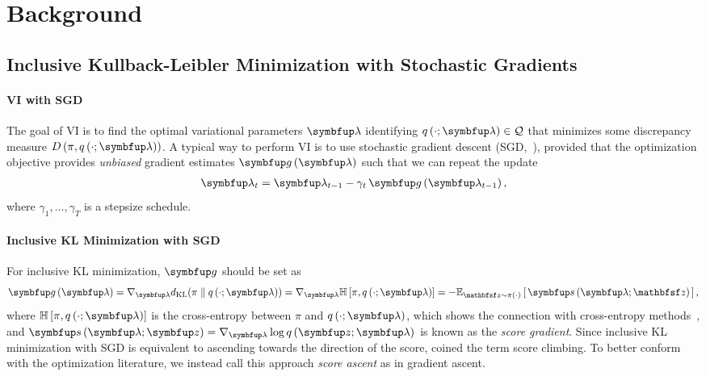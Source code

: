 
\vspace{-2ex}
\section{Background}
\vspace{-2ex}
\subsection{Inclusive Kullback-Leibler Minimization with Stochastic Gradients}\label{section:ivi_previous}
\vspace{-0.05in}
\paragraph{VI with SGD}
The goal of VI is to find the optimal variational parameters \(\vlambda\) identifying \(q\left(\cdot; \vlambda\right) \in \mathcal{Q}\) that minimizes some discrepancy measure \(D\left(\pi, q\left(\cdot; \vlambda\right)\right)\).
A typical way to perform VI is to use stochastic gradient descent (SGD,~\citealt{robbins_stochastic_1951}), provided that the optimization objective provides \textit{unbiased} gradient estimates \(\vg\,(\vlambda)\) such that we can repeat the update
{%
\begin{align*}
  \vlambda_{t} = \vlambda_{t-1} - \gamma_{t} \, \vg\left(\vlambda_{t-1}\right),
\end{align*}
}%
where \(\gamma_1, \ldots, \gamma_T\) is a stepsize schedule.

\vspace{-2ex}
\paragraph{Inclusive KL Minimization with SGD}
For inclusive KL minimization, \(\vg\) should be set as
%
{%
\begin{align*}
  \vg\left(\vlambda\right)
  = \nabla_{\vlambda} \DKL{\pi}{q\left(\cdot; \vlambda\right)}
  = \nabla_{\vlambda} \mathbb{H}\left[\pi, q\left(\cdot; \vlambda\right)\right]
  = -\Esub{\rvvz \sim \pi\left(\cdot\right)}{ \vs\,(\vlambda; \rvvz) },
\end{align*}
}%
%
where \(\mathbb{H}\left[\pi, q\left(\cdot; \vlambda\right)\right]\) is the cross-entropy between \(\pi\) and \(q\left(\cdot; \vlambda\right)\), which shows the connection with cross-entropy methods~\citep{deboer_tutorial_2005}, and \(\vs\,(\vlambda;\vz) = \nabla_{\vlambda} \log q\,(\vz; \vlambda)\) is known as the \textit{score gradient}.
Since inclusive KL minimization with SGD is equivalent to ascending towards the direction of the score, \citet{NEURIPS2020_b2070693} coined the term score climbing.
To better conform with the optimization literature, we instead call this approach \textit{score ascent} as in gradient ascent.

